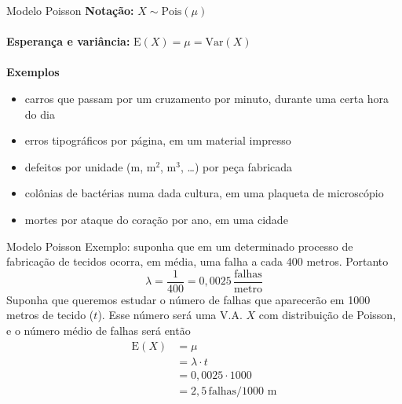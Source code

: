 \documentclass[10pt]{beamer}\usepackage[]{graphicx}\usepackage[]{color}
\providecommand{\E}{\text{E}}
\providecommand{\Var}{\text{Var}}
\theoremstyle{definition}
\begin{document}
\begin{frame}[fragile]{Modelo Poisson}
  \textbf{Notação:} $X \sim \text{Pois}(\mu)$ \\~\\
  \textbf{Esperança e variância:} $\E(X) = \mu = \Var(X)$ \\~\\
  \textbf{Exemplos}
  \begin{itemize}
  \item carros que passam por um cruzamento por minuto, durante uma
    certa hora do dia
  \item erros tipográficos por página, em um material impresso
  \item defeitos por unidade (m, m$^2$, m$^3$, \ldots) por peça
    fabricada
  \item colônias de bactérias numa dada cultura, em uma plaqueta de
    microscópio
  \item mortes por ataque do coração por ano, em uma cidade
  \end{itemize}
\end{frame}

\begin{frame}[fragile]{Modelo Poisson}
  Exemplo: suponha que em um determinado processo de fabricação de
  tecidos ocorra, em média, uma falha a cada 400 metros. Portanto
  \begin{equation*}
    \lambda = \frac{1}{400} = 0,0025 \,
    \frac{\text{falhas}}{\text{metro}}
  \end{equation*}
  Suponha que queremos estudar o número de falhas que aparecerão em 1000
  metros de tecido ($t$). Esse número será uma V.A. $X$ com distribuição
  de Poisson, e o número médio de falhas será então
  \begin{align*}
    \E(X) &= \mu \\
          &= \lambda \cdot t \\
          &= 0,0025 \cdot 1000 \\
          &= 2,5 \, \text{falhas/1000 m}
  \end{align*}
\end{frame}
\end{document}
